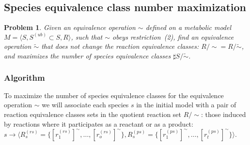 \documentclass[10pt]{bmc_article}
\newenvironment{bmcformat}{\baselineskip20pt\sloppy\setboolean{publ}{false}}{\baselineskip20pt\sloppy}
\begin{document}
\begin{bmcformat}
\subsection*{Species equivalence class number maximization}
\newtheorem{p1}[pbm]{Problem}
\begin{p1}
Given an equivalence operation $\sim$ defined on a metabolic model $M=\langle S, S^{(ub)}\subset{S}, R \rangle$, such that $\sim$ obeys restriction~(2), find an equivalence operation $\tilde{\sim}$ that does not change the reaction equivalence classes: $R/\sim = R/\tilde{\sim}$, and maximizes the number of species equivalence classes $\sharp S/\tilde{\sim}$. 
\end{p1}

\subsubsection*{Algorithm}
To maximize the number of species equivalence classes for the equivalence operation $\sim$ we will associate each species $s$ in the initial model with a pair of reaction equivalence classes sets in the quotient reaction set $R/{\sim}$: those induced by reactions where it participates as a reactant or as a product: $s \rightarrow \langle R^{(rs)}_s = \{[r^{(rs)}_1]^{\sim}, \ldots, [r^{(rs)}_o]^{\sim}\}, R^{(ps)}_s = \{[r^{(ps)}_1]^{\sim}, \ldots, [r^{(ps)}_t]^{\sim}\}\rangle$.


\end{bmcformat}
\end{document}
